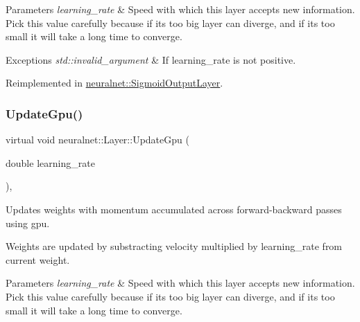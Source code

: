 \begin{DoxyParams}{Parameters}
{\em learning\+\_\+rate} & Speed with which this layer accepts new information. Pick this value carefully because if it\textquotesingle{}s too big layer can diverge, and if it\textquotesingle{}s too small it will take a long time to converge. \\
\hline
\end{DoxyParams}

\begin{DoxyExceptions}{Exceptions}
{\em std\+::invalid\+\_\+argument} & If learning\+\_\+rate is not positive. \\
\hline
\end{DoxyExceptions}


Reimplemented in \hyperlink{classneuralnet_1_1SigmoidOutputLayer_acb41e05e0cbf78f2498b39ea4e4bedb0}{neuralnet\+::\+Sigmoid\+Output\+Layer}.

\mbox{\label{classneuralnet_1_1Layer_af7520597d321aae360329b70f9476073}} 
\subsubsection{\texorpdfstring{Update\+Gpu()}{UpdateGpu()}}
{\footnotesize\ttfamily virtual void neuralnet\+::\+Layer\+::\+Update\+Gpu (\begin{DoxyParamCaption}\item[{double}]{learning\+\_\+rate }\end{DoxyParamCaption})\hspace{0.3cm}{\ttfamily [protected]}, {\ttfamily [virtual]}}



Updates weights with momentum accumulated across forward-\/backward passes using gpu. 

Weights are updated by substracting velocity multiplied by learning\+\_\+rate from current weight.


\begin{DoxyParams}{Parameters}
{\em learning\+\_\+rate} & Speed with which this layer accepts new information. Pick this value carefully because if it\textquotesingle{}s too big layer can diverge, and if it\textquotesingle{}s too small it will take a long time to converge. \\
\hline
\end{DoxyParams}


